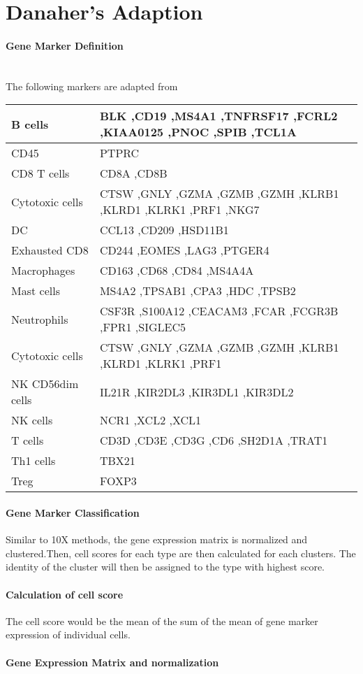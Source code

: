 \documentclass{article}
\begin{document}
\section{Danaher's Adaption}
\paragraph{Gene Marker Definition} ~\\
The following markers are adapted from  
\par
\begin{tabular}{ |l| p{10cm}| }
\hline
B cells&BLK ,CD19 ,MS4A1 ,TNFRSF17 ,FCRL2 ,KIAA0125 ,PNOC ,SPIB ,TCL1A \\ \hline
CD45&PTPRC \\ \hline
CD8 T cells&CD8A ,CD8B \\ \hline
Cytotoxic cells&CTSW ,GNLY ,GZMA ,GZMB ,GZMH ,KLRB1 ,KLRD1 ,KLRK1 ,PRF1 ,NKG7 \\ \hline
DC&CCL13 ,CD209 ,HSD11B1 \\ \hline 
Exhausted CD8&CD244 ,EOMES ,LAG3 ,PTGER4 \\\hline Macrophages&CD163 ,CD68 ,CD84 ,MS4A4A \\ \hline
Mast cells&MS4A2 ,TPSAB1 ,CPA3 ,HDC ,TPSB2 \\ \hline
Neutrophils&CSF3R ,S100A12 ,CEACAM3 ,FCAR ,FCGR3B ,FPR1 ,SIGLEC5 \\\hline
Cytotoxic cells&CTSW ,GNLY ,GZMA ,GZMB ,GZMH ,KLRB1 ,KLRD1 ,KLRK1 ,PRF1 \\\hline 
NK CD56dim cells&IL21R ,KIR2DL3 ,KIR3DL1 ,KIR3DL2 \\\hline
NK cells&NCR1 ,XCL2 ,XCL1 \\ \hline
T cells&CD3D ,CD3E ,CD3G ,CD6 ,SH2D1A ,TRAT1 \\ \hline
Th1 cells&TBX21 \\ \hline
Treg&FOXP3 \\
\hline
\end{tabular}
\paragraph{Gene Marker Classification}
 Similar to 10X methods, the gene expression matrix is normalized and clustered.Then, cell scores for each type are then calculated for each clusters. The identity of the cluster will then be assigned to the type with highest score. 
\paragraph{Calculation of cell score }
The cell score would be the mean of the sum of the mean of gene marker expression of individual cells. 
\paragraph{Gene Expression Matrix and normalization}
\end{document}

